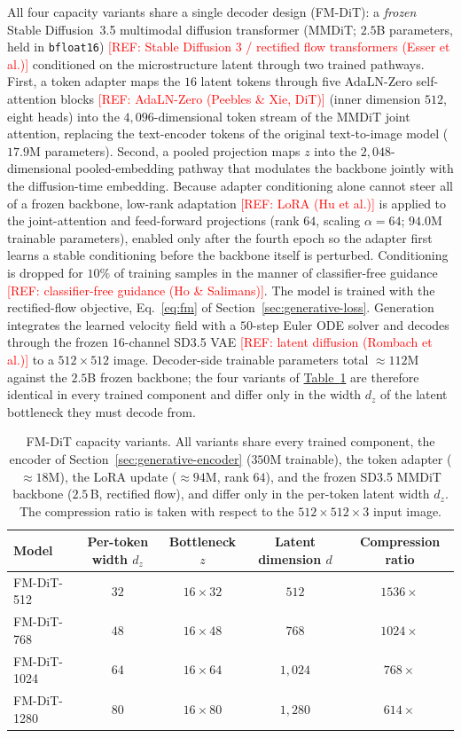 \documentclass[preprint,12pt]{elsarticle}
\newcommand{\tabref}[1]{\hyperref[#1]{Table~\ref*{#1}}}
\newcommand{\refneeded}[1]{\textcolor{red}{[REF: #1]}} %
\begin{document}
All four capacity variants share a single decoder design (FM-DiT): a \emph{frozen} Stable Diffusion~3.5 multimodal diffusion transformer (MMDiT; $2.5$B parameters, held in \texttt{bfloat16}) \refneeded{Stable Diffusion 3 / rectified flow transformers (Esser et al.)} conditioned on the microstructure latent through two trained pathways. First, a token adapter maps the $16$ latent tokens through five AdaLN-Zero self-attention blocks \refneeded{AdaLN-Zero (Peebles \& Xie, DiT)} (inner dimension $512$, eight heads) into the $4{,}096$-dimensional token stream of the MMDiT joint attention, replacing the text-encoder tokens of the original text-to-image model ($17.9$M parameters). Second, a pooled projection maps $z$ into the $2{,}048$-dimensional pooled-embedding pathway that modulates the backbone jointly with the diffusion-time embedding. Because adapter conditioning alone cannot steer all of a frozen backbone, low-rank adaptation \refneeded{LoRA (Hu et al.)} is applied to the joint-attention and feed-forward projections (rank $64$, scaling $\alpha=64$; $94.0$M trainable parameters), enabled only after the fourth epoch so the adapter first learns a stable conditioning before the backbone itself is perturbed. Conditioning is dropped for $10\%$ of training samples in the manner of classifier-free guidance \refneeded{classifier-free guidance (Ho \& Salimans)}. The model is trained with the rectified-flow objective, Eq.~\eqref{eq:fm} of Section~\ref{sec:generative-loss}. Generation integrates the learned velocity field with a $50$-step Euler ODE solver and decodes through the frozen $16$-channel SD3.5 VAE \refneeded{latent diffusion (Rombach et al.)} to a $512\times512$ image. Decoder-side trainable parameters total ${\approx}112$M against the $2.5$B frozen backbone; the four variants of \tabref{tab:models} are therefore identical in every trained component and differ only in the width $d_z$ of the latent bottleneck they must decode from.

\begin{table}[!t]
  \centering
  \caption{FM-DiT capacity variants. All variants share every trained component, the encoder of Section~\ref{sec:generative-encoder} ($350$M trainable), the token adapter (${\approx}18$M), the LoRA update (${\approx}94$M, rank $64$), and the frozen SD3.5 MMDiT backbone ($2.5$\,B, rectified flow), and differ only in the per-token latent width $d_z$. The compression ratio is taken with respect to the $512\times512\times3$ input image.}
  \label{tab:models}
  \small
  \begin{tabular}{lcccc}
    \toprule
    Model & Per-token width $d_z$ & Bottleneck $z$ & Latent dimension $d$ & Compression ratio \\
    \midrule
    FM-DiT-512  & $32$ & $16\times32$ & $512$     & $1536\times$ \\
    FM-DiT-768  & $48$ & $16\times48$ & $768$     & $1024\times$ \\
    FM-DiT-1024 & $64$ & $16\times64$ & $1{,}024$ & $768\times$ \\
    FM-DiT-1280 & $80$ & $16\times80$ & $1{,}280$ & $614\times$ \\
    \bottomrule
  \end{tabular}
\end{table}
\end{document}
